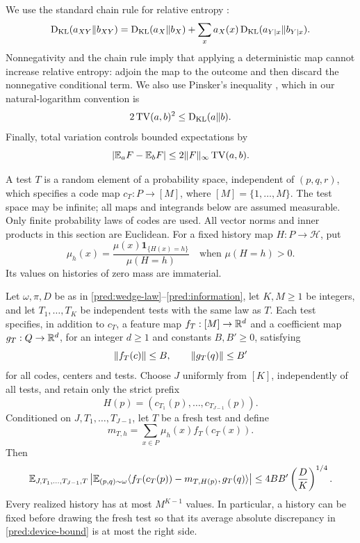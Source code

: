 We use the standard chain rule for relative entropy
\cite[Theorem~2.5.3]{CoverThomas2006}:
\begin{equation}\label{pred:chain-rule}
 \operatorname{D_{\mathrm{KL}}}(a_{XY}\Vert b_{XY})
 =\operatorname{D_{\mathrm{KL}}}(a_X\Vert b_X)
   +\sum_x a_X(x)\operatorname{D_{\mathrm{KL}}}(a_{Y\mid x}\Vert b_{Y\mid x}).
\end{equation}
Nonnegativity and the chain rule imply that applying a deterministic map
cannot increase relative entropy: adjoin the map to the outcome and then
discard the nonnegative conditional term. We also use Pinsker's inequality
\cite[Lemma~11.6.1]{CoverThomas2006}, which in our natural-logarithm
convention is
\begin{equation}\label{pred:pinsker}
 2\operatorname{TV}(a,b)^2\le\operatorname{D_{\mathrm{KL}}}(a\Vert b).
\end{equation}
Finally, total variation controls bounded expectations by
\begin{equation}\label{pred:tv-expectation}
 \lvert \mathbb E_a F-\mathbb E_b F\rvert\le2\lVert F\rVert_{\infty}\operatorname{TV}(a,b).
\end{equation}

A test \(T\) is a random element of a probability space, independent of
\((p,q,r)\), which specifies a code map \(c_T:P\to[M]\), where
\([M]=\{1,\ldots,M\}\).  The test space may be infinite; all maps and
integrands below are assumed measurable.  Only finite probability laws of
codes are used.  All vector norms and inner products in this section are
Euclidean.  For a fixed history map \(H:P\to\mathcal H\), put
\begin{equation}\label{pred:posterior-point}
 \mu_h(x)=\frac{\mu(x)\mathbf1_{\{H(x)=h\}}}{\mu(H=h)}
 \quad\text{when }\mu(H=h)>0.
\end{equation}
Its values on histories of zero mass are immaterial.

\begin{lemma}\label{pred:device}
Let \(\omega,\pi,D\) be as in \eqref{pred:wedge-law}--\eqref{pred:information},
let \(K,M\ge1\) be integers, and let \(T_1,\ldots,T_K\) be independent tests
with the same law as \(T\).  Each test specifies, in addition to \(c_T\),
a feature map \(f_T:[M]\to\mathbb R^d\) and a coefficient map
\(g_T:Q\to\mathbb R^d\), for an integer \(d\ge1\) and constants
\(B,B'\ge0\), satisfying
\[
 \lVert f_T(c)\rVert\le B,\qquad \lVert g_T(q)\rVert\le B'
\]
for all codes, centers and tests.  Choose \(J\) uniformly from \([K]\),
independently of all tests, and retain only the strict prefix
\[
 H(p)=(c_{T_1}(p),\ldots,c_{T_{J-1}}(p)).
\]
Conditioned on \(J,T_1,\ldots,T_{J-1}\), let \(T\) be a fresh test and define
\[
 m_{T,h}=\sum_{x\in P}\mu_h(x)f_T(c_T(x)).
\]
Then
\begin{equation}\label{pred:device-bound}
 \mathbb E_{J,T_1,\ldots,T_{J-1},T}
 \left|\mathbb E_{(p,q)\sim\omega}
 \langle f_T(c_T(p))-m_{T,H(p)},g_T(q)\rangle\right|
 \le4BB'\left(\frac DK\right)^{1/4}.
\end{equation}
Every realized history has at most \(M^{K-1}\) values.  In particular, a
history can be fixed before drawing the fresh test so that its average
absolute discrepancy in \eqref{pred:device-bound} is at most the right side.
\end{lemma}

